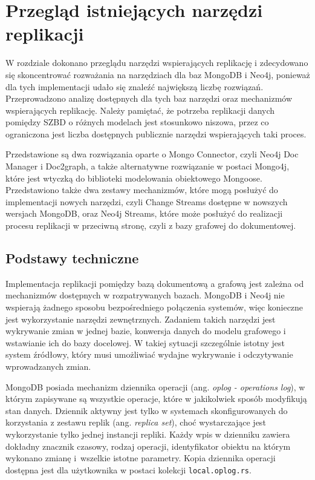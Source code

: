 \documentclass[a4paper,twoside,12pt]{book}
\newcommand{\obcy}[1]{\emph{#1}}
\newcommand{\ang}[1]{{\selectlanguage{british}\obcy{#1}}}
\begin{document}
\chapter{Przegląd istniejących narzędzi replikacji}

W rozdziale dokonano przeglądu narzędzi wspierających replikację i zdecydowano się skoncentrować rozważania na narzędziach dla baz MongoDB i Neo4j, ponieważ dla tych implementacji udało się znaleźć największą liczbę rozwiązań. Przeprowadzono analizę dostępnych dla tych baz narzędzi oraz mechanizmów wspierających replikację. Należy pamiętać, że potrzeba replikacji danych pomiędzy SZBD o różnych modelach jest stosunkowo niszowa, przez co ograniczona jest liczba dostępnych publicznie narzędzi wspierających taki proces.

Przedstawione są dwa rozwiązania oparte o Mongo Connector, czyli Neo4j Doc Manager i Doc2graph, a także alternatywne rozwiązanie w postaci Mongo4j, które jest wtyczką do biblioteki modelowania obiektowego Mongoose. Przedstawiono także dwa zestawy mechanizmów, które mogą posłużyć do implementacji nowych narzędzi, czyli Change Streams dostępne w nowszych wersjach MongoDB, oraz Neo4j Streams, które może posłużyć do realizacji procesu replikacji w przeciwną stronę, czyli z bazy grafowej do dokumentowej.

\vspace{3.2cm}

\section{Podstawy techniczne} 

Implementacja replikacji pomiędzy bazą dokumentową a grafową jest zależna od mechanizmów dostępnych w rozpatrywanych bazach. MongoDB i Neo4j nie wspierają żadnego sposobu bezpośredniego połączenia systemów, więc konieczne jest wykorzystanie narzędzi zewnętrznych. Zadaniem takich narzędzi jest wykrywanie zmian w jednej bazie, konwersja danych do modelu grafowego i wstawianie ich do bazy docelowej. W takiej sytuacji szczególnie istotny jest system źródłowy, który musi umożliwiać wydajne wykrywanie i odczytywanie wprowadzanych zmian.

MongoDB posiada mechanizm dziennika operacji (ang. \ang{oplog - operations log}), w którym zapisywane są wszystkie operacje, które w jakikolwiek sposób modyfikują stan danych. Dziennik aktywny jest tylko w systemach skonfigurowanych do korzystania z zestawu replik (ang. \ang{replica set}), choć wystarczające jest wykorzystanie tylko jednej instancji repliki. Każdy wpis w dzienniku zawiera dokładny znacznik czasowy, rodzaj operacji, identyfikator obiektu na którym wykonano zmianę i~wszelkie istotne parametry. Kopia dziennika operacji dostępna jest dla użytkownika w postaci kolekcji \lstinline{local.oplog.rs}.
\end{document}
